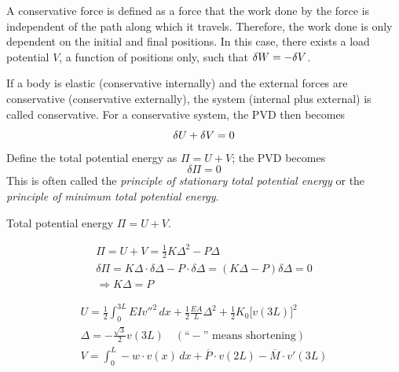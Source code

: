 A conservative force is defined as a force that the work done by the force is independent of the path along which it travels. Therefore, the work done is only dependent on the initial and final positions. In this case, there exists a load potential $V$, a function of positions only, such that $\delta W = -\delta V$.

If a body is elastic (conservative internally) and the external forces are conservative (conservative externally), the system (internal plus external) is called conservative. For a conservative system, the PVD then becomes
\begin{equation}
  \delta U + \delta V = 0
\end{equation}
Define the total potential energy as $\Pi = U + V$; the PVD becomes
\begin{equation}
  \delta\Pi = 0
\end{equation}
This is often called the \emph{principle of stationary total potential energy} or the \emph{principle of minimum total potential energy}.

Total potential energy $\Pi = U + V$.
\begin{fig}
  
\end{fig}
\begin{gather*}
  \Pi = U + V = \tfrac12 K\Delta^2 - P\Delta\\
  \delta\Pi = K\Delta\cdot\delta\Delta - P\cdot\delta\Delta = (K\Delta - P)\delta\Delta = 0\\
  \Rightarrow K\Delta = P
\end{gather*}
\begin{fig}
  
\end{fig}
\begin{gather*}
  U = \frac12\int_0^{3L}EIv''^2\,dx + \frac12\frac{EA}{L}\Delta^2 + \frac12K_0\bigl[v(3L)\bigr]^2\\
  \Delta = -\frac{\sqrt3}{2}v(3L)\quad(\text{``$-$'' means shortening})\\
  V = \int_0^L -w\cdot v(x)\,dx + \overline{P}\cdot v(2L) - \overline{M}\cdot v'(3L)
\end{gather*}

